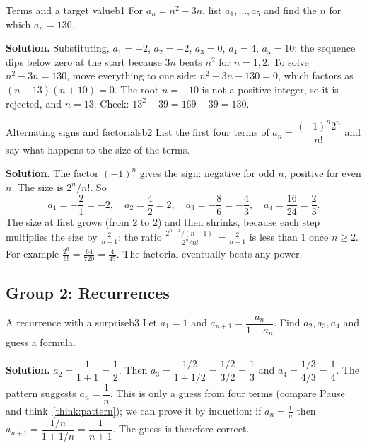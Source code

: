 \documentclass[11pt]{article}
\begin{document}
\begin{exmp}{Terms and a target value}{b1}
For $a_n=n^2-3n$, list $a_1,\dots,a_5$ and find the $n$ for which $a_n=130$.

\textbf{Solution.} Substituting, $a_1=-2$, $a_2=-2$, $a_3=0$, $a_4=4$, $a_5=10$; the sequence dips below zero at the start because $3n$ beats $n^2$ for $n=1,2$.
To solve $n^2-3n=130$, move everything to one side: $n^2-3n-130=0$, which factors as $(n-13)(n+10)=0$. The root $n=-10$ is not a positive integer, so it is rejected, and $n=13$. Check: $13^2-39=169-39=130$.
\end{exmp}

\begin{exmp}{Alternating signs and factorials}{b2}
List the first four terms of $a_n=\dfrac{(-1)^n2^n}{n!}$ and say what happens to the size of the terms.

\textbf{Solution.} The factor $(-1)^n$ gives the sign: negative for odd $n$, positive for even $n$. The size is $2^n/n!$. So
\[
a_1=-\frac21=-2,\quad a_2=\frac42=2,\quad a_3=-\frac86=-\frac43,\quad a_4=\frac{16}{24}=\frac23 .
\]
The size at first grows (from $2$ to $2$) and then shrinks, because each step multiplies the size by $\frac2{n+1}$: the ratio $\frac{2^{n+1}/(n+1)!}{2^n/n!}=\frac{2}{n+1}$ is less than $1$ once $n\ge2$. For example $\frac{2^6}{6!}=\frac{64}{720}=\frac4{45}$. The factorial eventually beats any power.
\end{exmp}

\subsection*{Group 2: Recurrences}

\begin{exmp}{A recurrence with a surprise}{b3}
Let $a_1=1$ and $a_{n+1}=\dfrac{a_n}{1+a_n}$. Find $a_2,a_3,a_4$ and guess a formula.

\textbf{Solution.} $a_2=\dfrac{1}{1+1}=\dfrac12$. Then $a_3=\dfrac{1/2}{1+1/2}=\dfrac{1/2}{3/2}=\dfrac13$ and $a_4=\dfrac{1/3}{4/3}=\dfrac14$.
The pattern suggests $a_n=\dfrac1n$. This is only a guess from four terms (compare Pause and think~\ref{think:pattern}); we can prove it by induction: if $a_n=\frac1n$ then $a_{n+1}=\dfrac{1/n}{1+1/n}=\dfrac{1}{n+1}$. The guess is therefore correct.
\end{exmp}
\end{document}
